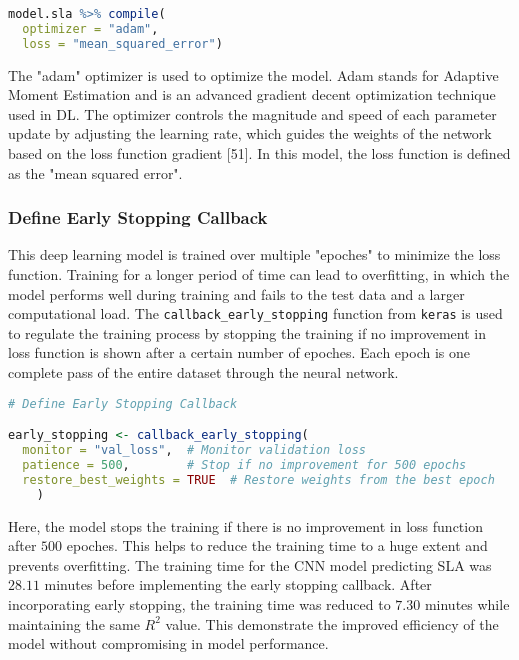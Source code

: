 \documentclass[12pt,a4paper]{report}
\begin{document}
\begin{lstlisting}[language=R, style=mystyle]
model.sla %>% compile(
  optimizer = "adam",
  loss = "mean_squared_error")
\end{lstlisting}

The "adam" optimizer is used to optimize the model. Adam stands for Adaptive Moment Estimation and is an advanced gradient decent optimization technique used in DL. The optimizer controls the magnitude and speed of each parameter update by adjusting the learning rate, which guides the weights of the network based on the loss function gradient [51]. In this model, the loss function is defined as the "mean squared error". \\

\subsubsection*{Define Early Stopping Callback}
This deep learning model is trained over multiple "epoches" to minimize the loss function. Training for a longer period of time can lead to overfitting, in which the model performs well during training and fails to the test data and a larger computational load. The \texttt{callback\_early\_stopping} function from \texttt{keras} is used to regulate the training process by stopping the training if no improvement in loss function is shown after a certain number of epoches. Each epoch is one complete pass of the entire dataset through the neural network. \\

\begin{lstlisting}[language=R, style=mystyle]
# Define Early Stopping Callback

early_stopping <- callback_early_stopping(
  monitor = "val_loss",  # Monitor validation loss
  patience = 500,        # Stop if no improvement for 500 epochs 
  restore_best_weights = TRUE  # Restore weights from the best epoch
    )
\end{lstlisting}

Here, the model stops the training if there is no improvement in loss function after $500$ epoches. This helps to reduce the training time to a huge extent and prevents overfitting. The training time for the CNN model predicting SLA was $28.11$ minutes before implementing the early stopping callback. After incorporating early stopping, the training time was reduced to $7.30$ minutes while maintaining the same $R^2$ value. This demonstrate the improved efficiency of the model without compromising in model performance. \\
\end{document}
